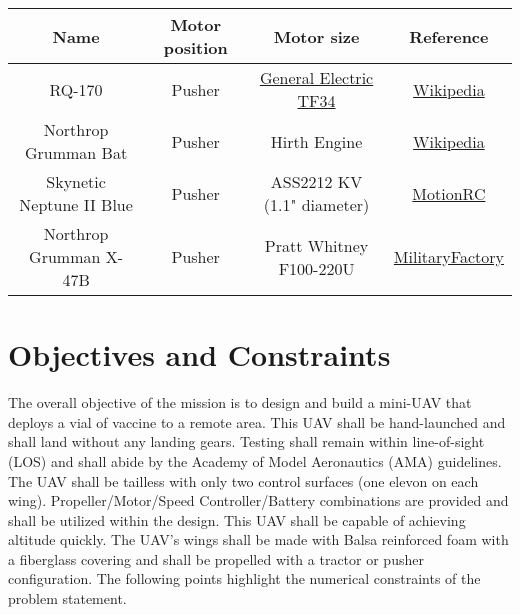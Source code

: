     \begin{table}[H]
        \begin{tabular}{|c|c|c|c| } %
            \hline \textbf{Name} & \textbf{Motor position} & \textbf{Motor size} & \textbf{Reference} \\ \hline %
            RQ-170  & Pusher & \href{https://en.wikipedia.org/wiki/General_Electric_TF34}{General Electric TF34} & \href{https://en.wikipedia.org/wiki/Lockheed_Martin_RQ-170_Sentinel}{Wikipedia}\\ \hline
            Northrop Grumman Bat & Pusher & Hirth Engine & \href{https://en.wikipedia.org/wiki/Northrop_Grumman_Bat}{Wikipedia}\\ \hline

             Skynetic Neptune II Blue & Pusher & ASS2212 KV (1.1" diameter) & \href{https://www.motionrc.com/products/skynetic-neptune-ii-blue-1000mm-39-3-wingspan-pnp?variant=39681690927289}{MotionRC}\\ \hline
             Northrop Grumman X-47B & Pusher & Pratt Whitney F100-220U & \href{https://www.militaryfactory.com/aircraft/detail.php?aircraft_id=1015}{MilitaryFactory} \\ \hline
        \end{tabular}
    \end{table}

\section{Objectives and Constraints}

    The overall objective of the mission is to design and build a mini-UAV that deploys a vial of vaccine to a remote area. This UAV shall be hand-launched and shall land without any landing gears. Testing shall remain within line-of-sight (LOS) and shall abide by the Academy of Model Aeronautics (AMA) guidelines. The UAV shall be tailless with only two control surfaces (one elevon on each wing). Propeller/Motor/Speed Controller/Battery combinations are provided and shall be utilized within the design. This UAV shall be capable of achieving altitude quickly. The UAV's wings shall be made with Balsa reinforced foam with a fiberglass covering and shall be propelled with a tractor or pusher configuration.
    The following points highlight the numerical constraints of the problem statement.
    
